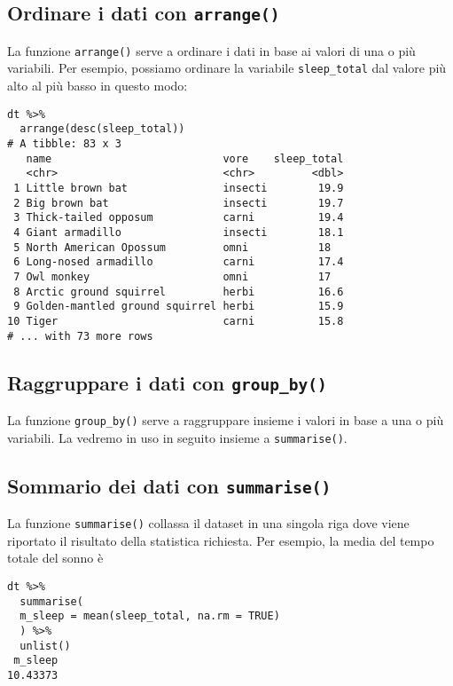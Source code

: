 \subsection{Ordinare i dati con \texttt{arrange()}}

La funzione \texttt{arrange()} serve a ordinare i dati in base ai valori di una o più variabili.  
Per esempio, possiamo ordinare la variabile \verb+sleep_total+ dal valore più alto al più basso in questo modo:

\begin{lstlisting}
dt %>% 
  arrange(desc(sleep_total))
# A tibble: 83 x 3
   name                           vore    sleep_total
   <chr>                          <chr>         <dbl>
 1 Little brown bat               insecti        19.9
 2 Big brown bat                  insecti        19.7
 3 Thick-tailed opposum           carni          19.4
 4 Giant armadillo                insecti        18.1
 5 North American Opossum         omni           18  
 6 Long-nosed armadillo           carni          17.4
 7 Owl monkey                     omni           17  
 8 Arctic ground squirrel         herbi          16.6
 9 Golden-mantled ground squirrel herbi          15.9
10 Tiger                          carni          15.8
# ... with 73 more rows
\end{lstlisting}


\subsection{Raggruppare i dati con \texttt{group\_by()}}

La funzione \texttt{group\_by()} serve a raggruppare insieme i valori in base a una o più variabili. 
La vedremo in uso in seguito insieme a \texttt{summarise()}.


\subsection{Sommario dei dati con \texttt{summarise()}}

La funzione \verb+summarise()+ collassa il dataset in una singola riga dove viene riportato il risultato della statistica richiesta. 
Per esempio, la media del tempo totale del sonno è

\begin{lstlisting}
dt %>% 
  summarise(
  m_sleep = mean(sleep_total, na.rm = TRUE)
  ) %>% 
  unlist()
 m_sleep 
10.43373 
\end{lstlisting}


